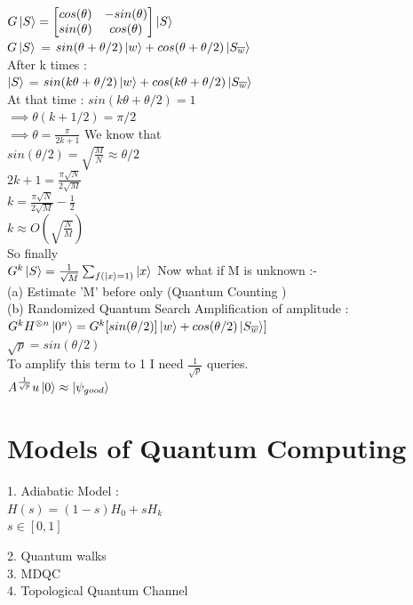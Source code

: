 \documentclass{article}
\begin{document}
\(  
G\ket{S} = 
\begin{bmatrix}
cos(\theta) & -sin(\theta) \\
sin(\theta) & cos(\theta)
\end{bmatrix}\ket{S}
\)\\
$G\ket{S}$ = $sin(\theta+\theta/2)\ket{w} + cos(\theta+\theta/2)\ket{S_{\overline{w}}}$\\
After k times : \\
$\ket{S}$ = $sin(k\theta+\theta/2)\ket{w} + cos(k\theta+\theta/2)\ket{S_{\overline{w}}}$\\
At that time : 
$sin(k\theta+\theta/2) = 1$\\
$\implies \theta(k+1/2)=\pi/2$\\
$\implies \theta = \frac{\pi}{2k+1}$
We know that \\
$sin(\theta/2) = \sqrt{\frac{M}{N}} \approx \theta/2$\\
$2k+1=\frac{\pi\sqrt{N}}{2\sqrt{M}}$\\
$k=\frac{\pi\sqrt{N}}{2\sqrt{M}} - \frac{1}{2}$\\
$k\approx O(\sqrt{\frac{N}{M}})$\\
So finally \\
$G^k\ket{S} = \frac{1}{\sqrt{M}} \sum_{f(\ket{x}=1)}\ket{x}$
\newline \newline
Now what if M is unknown :- \\
(a) Estimate 'M' before only  (Quantum Counting )\\
(b) Randomized Quantum Search 
\newline \newline
Amplification of amplitude : \\
$G^kH^{\otimes n}\ket{0^n} = G^k[sin(\theta/2)]\ket{w} + cos(\theta/2)\ket{S_{\overline{w}}}]$\\
$\sqrt{p}=sin(\theta/2)$\\
To amplify this term to 1 I need $\frac{1}{\sqrt{p}}$ queries.\\
$A^{\frac{1}{\sqrt{p}}}u\ket{0} \approx \ket{\psi_{good}}$

\section{Models of Quantum Computing }
1. Adiabatic Model : \\
$H(s) = (1-s)H_0+sH_k$\\
$s \in [0,1]$

2. Quantum walks \\
3. MDQC\\
4. Topological Quantum Channel \\
\end{document}
